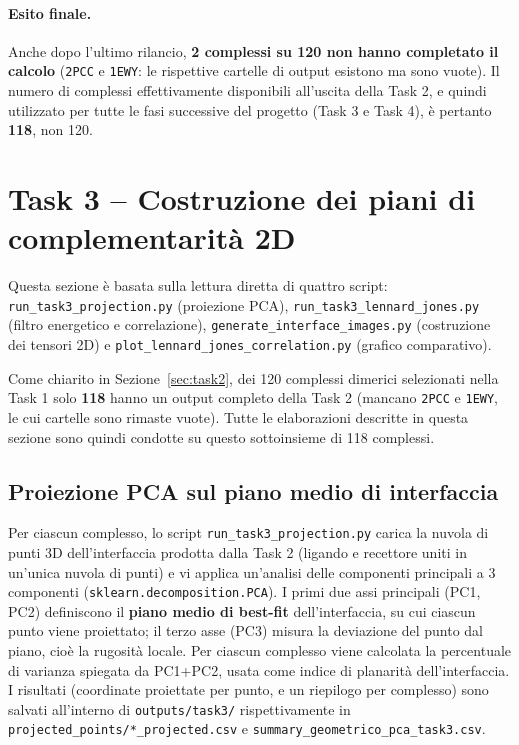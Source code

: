 \documentclass[11pt,a4paper]{article}
\begin{document}
\paragraph{Esito finale.} Anche dopo l'ultimo rilancio, \textbf{2 complessi su 120 non hanno completato il calcolo} (\texttt{2PCC} e \texttt{1EWY}: le rispettive cartelle di output esistono ma sono vuote). Il numero di complessi effettivamente disponibili all'uscita della Task 2, e quindi utilizzato per tutte le fasi successive del progetto (Task 3 e Task 4), è pertanto \textbf{118}, non 120.
 
\section{Task 3 -- Costruzione dei piani di complementarità 2D}
\label{sec:task3}
 
Questa sezione è basata sulla lettura diretta di quattro script: \texttt{run\_task3\_projection.py} (proiezione PCA), \texttt{run\_task3\_lennard\_jones.py} (filtro energetico e correlazione), \texttt{generate\_interface\_images.py} (costruzione dei tensori 2D) e \texttt{plot\_lennard\_jones\_correlation.py} (grafico comparativo).
 
Come chiarito in Sezione~\ref{sec:task2}, dei 120 complessi dimerici selezionati nella Task 1 solo \textbf{118} hanno un output completo della Task 2 (mancano \texttt{2PCC} e \texttt{1EWY}, le cui cartelle sono rimaste vuote). Tutte le elaborazioni descritte in questa sezione sono quindi condotte su questo sottoinsieme di 118 complessi.
 
\subsection{Proiezione PCA sul piano medio di interfaccia}
Per ciascun complesso, lo script \texttt{run\_task3\_projection.py} carica la nuvola di punti 3D dell'interfaccia prodotta dalla Task 2 (ligando e recettore uniti in un'unica nuvola di punti) e vi applica un'analisi delle componenti principali a 3 componenti (\texttt{sklearn.decomposition.PCA}). I primi due assi principali (PC1, PC2) definiscono il \textbf{piano medio di best-fit} dell'interfaccia, su cui ciascun punto viene proiettato; il terzo asse (PC3) misura la deviazione del punto dal piano, cioè la rugosità locale. Per ciascun complesso viene calcolata la percentuale di varianza spiegata da PC1+PC2, usata come indice di planarità dell'interfaccia. I risultati (coordinate proiettate per punto, e un riepilogo per complesso) sono salvati all'interno di \texttt{outputs/task3/} rispettivamente in \texttt{projected\_points/*\_projected.csv} e \texttt{summary\_geometrico\_pca\_task3.csv}.
 
\end{document}

